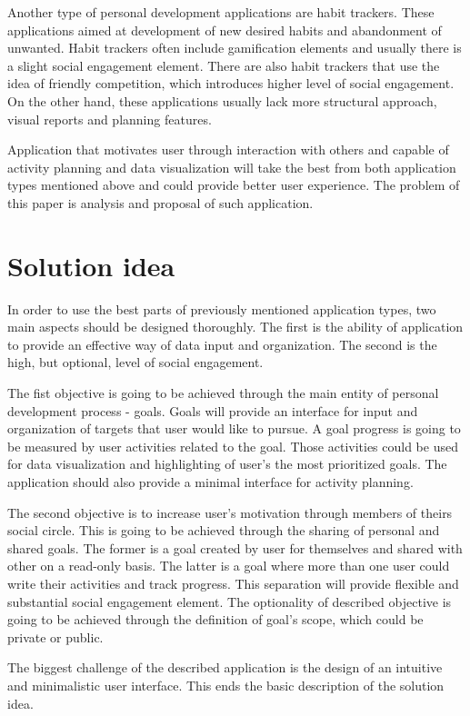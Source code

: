 Another type of personal development applications are habit trackers.
These applications aimed at development of new desired habits and abandonment of unwanted.
Habit trackers often include gamification elements and usually there is a slight social engagement element.
There are also habit trackers that use the idea of friendly competition, which introduces higher level of social engagement.
On the other hand, these applications usually lack more structural approach, visual reports and planning features.

Application that motivates user through interaction with others and capable of activity planning and data visualization
will take the best from both application types mentioned above and could provide better user experience.
The problem of this paper is analysis and proposal of such application.


\section{Solution idea}\label{sec:solution-idea}

In order to use the best parts of previously mentioned application types, two main aspects should be designed thoroughly.
The first is the ability of application to provide an effective way of data input and organization.
The second is the high, but optional, level of social engagement.

The fist objective is going to be achieved through the main entity of personal development process - goals.
Goals will provide an interface for input and organization of targets that user would like to pursue.
A goal progress is going to be measured by user activities related to the goal.
Those activities could be used for data visualization and highlighting of user's the most prioritized goals.
The application should also provide a minimal interface for activity planning.

The second objective is to increase user's motivation through members of theirs social circle.
This is going to be achieved through the sharing of personal and shared goals.
The former is a goal created by user for themselves and shared with other on a read-only basis.
The latter is a goal where more than one user could write their activities and track progress.
This separation will provide flexible and substantial social engagement element.
The optionality of described objective is going to be achieved through the definition of goal's scope, which could be private or public.

The biggest challenge of the described application is the design of an intuitive and minimalistic user interface.
This ends the basic description of the solution idea.
